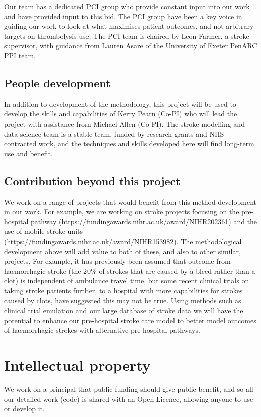 Our team has a dedicated PCI group who provide constant input into our work and have provided input to this bid. The PCI group have been a key voice in guiding our work to look at what maximises patient outcomes, and not arbitrary targets on thrombolysis use. The PCI team is chaired by Leon Farmer, a stroke supervisor, with guidance from Lauren Asare of the University of Exeter PenARC PPI team.

\subsection{People development}

In addition to development of the methodology, this project will be used to develop the skills and capabilities of Kerry Pearn (Co-PI) who will lead the project with assistance from Michael Allen (Co-PI). The stroke modelling and data science team is a stable team, funded by research grants and NHS-contracted work, and the techniques and skills developed here will find long-term use and benefit.

\subsection{Contribution beyond this project}

We work on a range of projects that would benefit from this method development in our work. For example, we are working on stroke projects focusing on the pre-hospital pathway (\url{https://fundingawards.nihr.ac.uk/award/NIHR202361}) and the use of mobile stroke units (\url{https://fundingawards.nihr.ac.uk/award/NIHR153982}). The methodological development above will add value to both of these, and also to other similar, projects. For example, it has previously been assumed that outcome from haemorrhagic stroke (the 20\% of strokes that are caused by a bleed rather than a clot) is independent of ambulance travel time, but some recent clinical trials on taking stroke patients further, to a hospital with more capabilities for strokes caused by clots, have suggested this may not be true. Using methods such as clinical trial emulation and our large database of stroke data we will have the potential to enhance our pre-hospital stroke care model to better model outcomes of haemorrhagic strokes with alternative pre-hospital pathways.

\section{Intellectual property}

We work on a principal that public funding should give public benefit, and so all our detailed work (code) is shared with an Open Licence, allowing anyone to use or develop it.
